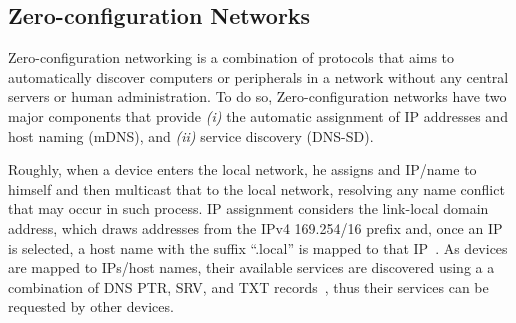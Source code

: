 \subsection{Zero-configuration Networks}
\label{sec:zeroconf}



Zero-configuration networking is a combination of protocols that aims to automatically discover computers or peripherals in a network without any central servers or human administration. To do so, Zero-configuration networks have two major components that provide {\it (i)} the automatic assignment of IP addresses and host naming (mDNS), and {\it (ii)} service discovery (DNS-SD).


Roughly, when a device enters the local network, he assigns and IP/name to himself and then multicast that to the local network, resolving any name conflict that may occur in such process. IP assignment considers the link-local domain address, which draws addresses from the IPv4 169.254/16 prefix and, once an IP is selected, a host name with the suffix ``.local'' is mapped to that IP~\cite{rfc6762}. As devices are mapped to IPs/host names, their available services are discovered using a a combination of DNS PTR, SRV, and TXT records~\cite{rfc6763}, thus their services can be requested by other devices. 


